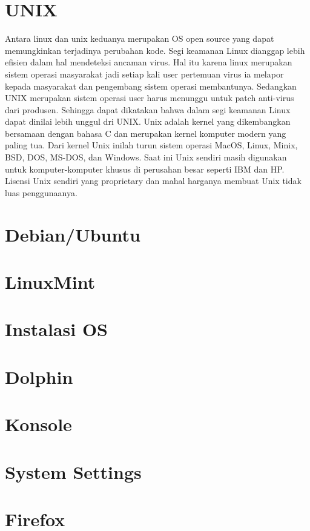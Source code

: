 \documentclass[11pt,fleqn]{book} %
\begin{document}
\section{UNIX}
\begin{flushleft}
 \hspace{10pt} Antara linux dan unix keduanya merupakan OS open source yang dapat memungkinkan terjadinya perubahan kode.
 Segi keamanan Linux dianggap lebih efisien dalam hal mendeteksi ancaman virus. 
 Hal itu karena linux merupakan sistem operasi masyarakat jadi setiap kali user pertemuan virus ia melapor kepada masyarakat dan pengembang sistem operasi membantunya.
 Sedangkan UNIX merupakan sistem operasi user harus menunggu untuk patch anti-virus dari produsen.
 Sehingga dapat dikatakan bahwa dalam segi keamanan Linux dapat dinilai lebih unggul dri UNIX.
 Unix adalah kernel yang dikembangkan bersamaan dengan bahasa C dan merupakan kernel komputer modern yang paling tua.
 Dari kernel Unix inilah turun sistem operasi MacOS, Linux, Minix, BSD, DOS, MS-DOS, dan Windows.
 Saat ini Unix sendiri masih digunakan untuk komputer-komputer khusus di perusahan besar seperti IBM dan HP.
 Lisensi Unix sendiri yang proprietary dan mahal harganya membuat Unix tidak luas penggunaanya.
\end{flushleft}

\section{Debian/Ubuntu}
\section{LinuxMint}
\section{Instalasi OS}
\section{Dolphin}
\section{Konsole}
\section{System Settings}
\section{Firefox}
\end{document}
